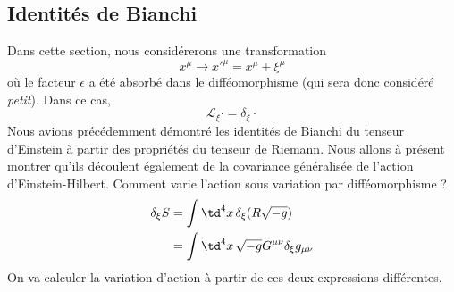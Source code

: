 \subsection{Identités de Bianchi}
Dans cette section, nous considérerons une transformation 
\begin{equation}
    x^\mu \to x'^\mu = x^\mu + \xi^\mu
\end{equation}
où le facteur $\epsilon$ a été absorbé dans le difféomorphisme (qui sera donc considéré \emph{petit}). Dans ce cas,
\begin{equation}
    \mathcal{L}_\xi \cdot = \delta_\xi \cdot
\end{equation}
Nous avions précédemment démontré les identités de Bianchi du tenseur d'Einstein à partir des propriétés du tenseur de Riemann. Nous allons à présent montrer qu'ils découlent également de la covariance généralisée de l'action d'Einstein-Hilbert. Comment varie l'action sous variation par difféomorphisme ?
\begin{align}
    \delta_{\xi}S &= \int \td ^4x \, \delta_{\xi}(R\sqrt{-g}) \\
    &= \int \td ^4x \, \sqrt{-g}G^{\mu \nu}\delta_{\xi}g_{\mu \nu}
\end{align}
On va calculer la variation d'action à partir de ces deux expressions différentes. 

